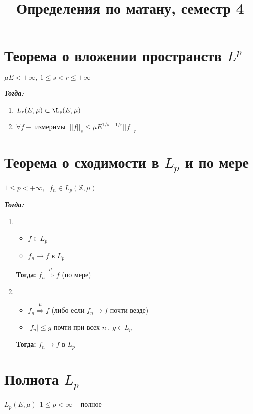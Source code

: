 \documentclass[paper=a4, fontsize=17pt]{article}
\title{Определения по матану, семестр 4}
\begin{document}
	\maketitle
	\tableofcontents
	\newpage
	
\section{Теорема о вложении пространств $L^p$}

$ \mu E < +\infty, ~ 1 \leq s < r \leq + \infty$

\textbf{\emph{Тогда:}} 

\begin{enumerate}
	\item $ L_r(E, \mu)  \subset \L_s(E, \mu)$
	\item $ \forall f - $ измеримы $ ~ ||f||_s \leq \mu E^{1/s - 1/r} ||f||_r$
\end{enumerate}	

\section{Теорема о сходимости в $L_p$ и по мере}
$ 1 \leq p < +\infty, ~$
$ f_n \in L_p(\mathbb{X}, \mu)$

\textbf{\emph{Тогда:}}

\begin{enumerate}
	
	
	\item \begin{itemize}
		\item $ f \in L_p $
		\item $ f_n \rightarrow f $ в $ L_p $
	\end{itemize} 
	\textbf{Тогда:} $ f_n \stackrel{\mu}{\Rightarrow} f $ (по мере)
		
	\item \begin{itemize}
		\item $ f_n \stackrel{\mu}{\Rightarrow} f $ (либо если $ f_n \rightarrow f $  почти везде)
		\item $ |f_n| \leq g $ почти при всех $ n ~ , ~ g \in L_p $
	\end{itemize} 
	\textbf{Тогда:} $ f_n \rightarrow f $ в $ L_p $
\end{enumerate}

\section{Полнота $L_p$}
$ L_p(E, \mu) ~ ~ 1 \leq p < \infty $ -- полное 
\end{document}
